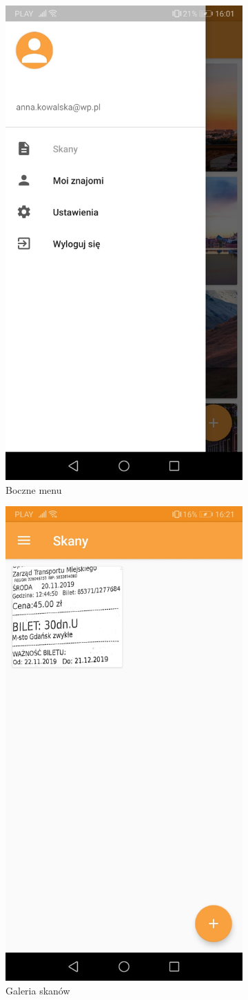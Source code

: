 \documentclass[10pt,twoside,a4paper]{report}
\begin{document}
\begin{figure}[h]
\begin{subfigure}{0.5\textwidth}
\centering
\includegraphics[width=0.9\linewidth, width=5cm]{sideBar}
\caption{Boczne menu}
\label{fig:sideBar}
\end{subfigure}
\begin{subfigure}{0.5\textwidth}
\centering
\includegraphics[width=0.9\linewidth, width=5cm]{scans}
\caption{Galeria skanów}
\label{fig:scans}
\end{subfigure}
\begin{subfigure}{0.5\textwidth}
\centering

\end{subfigure}
\end{figure}
\end{document}
